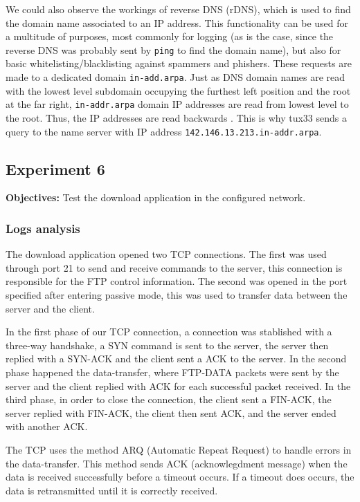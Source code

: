\documentclass[a4paper, 11pt]{report}
\begin{document}
We could also observe the workings of reverse DNS (rDNS), which is used to find the domain name associated to an IP address.
This functionality can be used for a multitude of purposes, most commonly for logging (as is the case, since the reverse DNS was probably sent by \texttt{ping} to find the domain name), but also for basic whitelisting/blacklisting against spammers and phishers.
These requests are made to a dedicated domain \texttt{in-add.arpa}.
Just as DNS domain names are read with the lowest level subdomain occupying the furthest left position and the root at the far right, \texttt{in-addr.arpa} domain IP addresses are read from lowest level to the root. Thus, the IP addresses are read backwards \cite{in-addr-arpa}.
This is why tux33 sends a query to the name server with IP address \texttt{142.146.13.213.in-addr.arpa}.

\subsection{Experiment 6} \label{sec:Exp6}

\textbf{Objectives:} Test the download application in the configured network.

\subsubsection{Logs analysis} \label{sec:Log6}

The download application opened two TCP connections. 
The first was used through port 21 to send and receive commands to the server, this connection is responsible for the FTP control information.
The second was opened in the port specified after entering passive mode, this was used to transfer data between the server and the client.

In the first phase of our TCP connection, a connection was stablished with a three-way handshake, a SYN command is sent to the server, the server then replied with a SYN-ACK and the client sent a ACK to the server.
In the second phase happened the data-transfer, where FTP-DATA packets were sent by the server and the client replied with ACK for each successful packet received.
In the third phase, in order to close the connection, the client sent a FIN-ACK, the server replied with FIN-ACK, the client then sent ACK, and the server ended with another ACK. 

The TCP uses the method ARQ (Automatic Repeat Request) to handle errors in the data-transfer.
This method sends ACK (acknowlegdment message) when the data is received successfully before a timeout occurs.
If a timeout does occurs, the data is retransmitted until it is correctly received.
\end{document}
